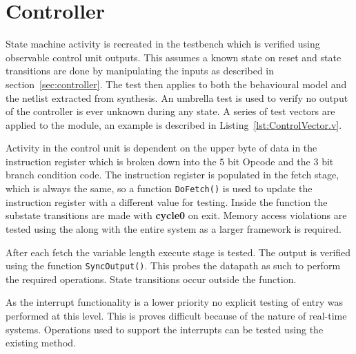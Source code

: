 
\section{Controller}

State machine activity is recreated in the testbench which is verified using observable control unit outputs.
This assumes a known state on reset and state transitions are done by manipulating the inputs as described in section~\ref{sec:controller}.  
The test then applies to both the behavioural model and the netlist extracted from synthesis.
An umbrella test is used to verify no output of the controller is ever unknown during any state.
A series of test vectors are applied to the module, an example is described in Listing~\ref{lst:ControlVector.v}.




Activity in the control unit is dependent on the upper byte of data in the instruction register which is broken down into the $5$ bit Opcode and the $3$ bit branch condition code.  
The instruction register is populated in the fetch stage, which is always the same, so a function \texttt{DoFetch()} is used to update the instruction register with a different value for testing.
Inside the function the substate transitions are made with \textbf{cycle0} on exit.
Memory access violations are tested using the  along with the entire system as a larger framework is required.

After each fetch the variable length execute stage is tested.
The output is verified using the function \texttt{SyncOutput()}. 
This probes the datapath as such to perform the required operations.
State transitions occur outside the function.

As the interrupt functionality is a lower priority no explicit testing of entry was performed at this level.
This is proves difficult because of the nature of real-time systems.
Operations used to support the interrupts can be tested using the existing method. 
